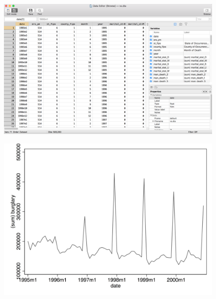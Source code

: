 \documentclass[notes=show]{beamer}
\begin{document}
\begin{frame}[plain]

\begin{figure}
\centering
\includegraphics[scale=0.15]{./lecture_includes/browse.png}
\end{figure}

\end{frame}


\begin{frame}[plain]

\begin{figure}
\centering
\includegraphics[scale=0.10]{./lecture_includes/burglaries.jpg}
\end{figure}

\end{frame}
\end{document}
